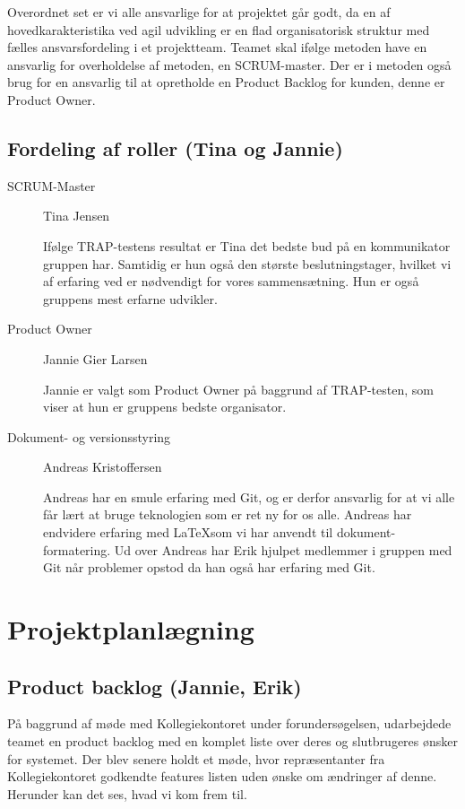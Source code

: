 \documentclass[12pt, a4paper]{report}
\begin{document}
Overordnet set er vi alle ansvarlige for at projektet går godt, da en af hovedkarakteristika ved agil udvikling er en flad organisatorisk struktur med fælles ansvarsfordeling i et projektteam. Teamet skal ifølge metoden have en ansvarlig for overholdelse af metoden, en SCRUM-master. Der er i metoden også brug for en ansvarlig til at opretholde en Product Backlog for kunden, denne er Product Owner.

\subsection{Fordeling af roller (Tina og Jannie)}

\begin{description}

\item[SCRUM-Master] Tina Jensen

Ifølge TRAP-testens resultat er Tina det bedste bud på en kommunikator gruppen har. Samtidig er hun også den største beslutningstager, hvilket vi af erfaring ved er nødvendigt for vores sammensætning. Hun er også gruppens mest erfarne udvikler.

\item[Product Owner] Jannie Gier Larsen

Jannie er valgt som Product Owner på baggrund af TRAP-testen, som viser at hun er gruppens bedste organisator.

\item[Dokument- og versionsstyring] Andreas Kristoffersen

Andreas har en smule erfaring med Git, og er derfor ansvarlig for at vi alle får lært at bruge teknologien som er ret ny for os alle. Andreas har endvidere erfaring med \LaTeX som vi har anvendt til dokument-formatering. Ud over Andreas har Erik hjulpet medlemmer i gruppen med Git når problemer opstod da han også har erfaring med Git.

\end{description}

\section{Projektplanlægning}

\subsection{Product backlog (Jannie, Erik)}

På baggrund af møde med Kollegiekontoret under forundersøgelsen, udarbejdede teamet en product backlog med en komplet liste over deres og slutbrugeres ønsker for systemet. Der blev senere holdt et møde, hvor repræsentanter fra Kollegiekontoret godkendte features listen uden ønske om ændringer af denne. Herunder kan det ses, hvad vi kom frem til.
\end{document}
